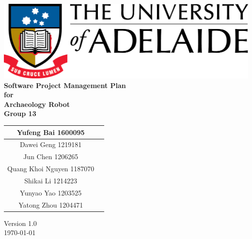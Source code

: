 \begin{center}
\includegraphics[scale=1.5]{./UniLogo}\\[1cm]    
\textbf{\Huge \bfseries Software Project Management Plan}\\[1.5cm]
\textbf{\huge for}\\[0.5cm]


\textbf{ \huge Archaeology Robot }\\[0.3cm]
\textbf{ \huge Group 13 }\\[2cm]


\begin{tabular}{ |c | p{2cm} |}
	\hline
Yufeng Bai 1600095 & \\[.5cm] \hline
Dawei Geng 1219181 & \\[.5cm] \hline
Jun Chen 1206265 & \\[.5cm] \hline
Quang Khoi Nguyen 1187070  & \\[.5cm] \hline
Shikai Li 1214223 & \\[.5cm] \hline
Yunyao Yao 1203525 & \\[.5cm] \hline
Yatong Zhou 1204471 & \\[.5cm] \hline
\end{tabular}


\vfill

Version 1.0 \\ [0.2cm]
{\large \today}

\end{center}

